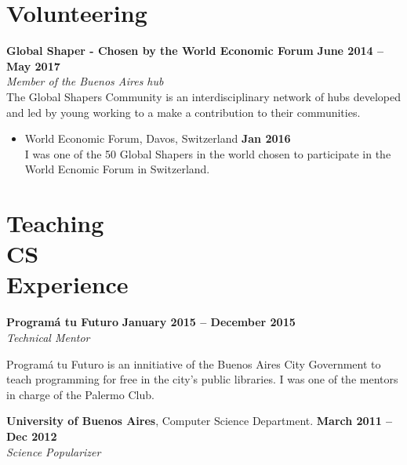 \documentclass[margin,line]{resume}
\begin{document}
\begin{resume}
\section{\mysidestyle Volunteering}



\textbf{Global Shaper - Chosen by the World Economic Forum} \hfill \textbf{June 2014 -- May 2017} \vspace{2mm}\\\vspace{1mm}
\textsl{Member of the Buenos Aires hub} \\
The Global Shapers Community is an interdisciplinary network of hubs developed and led by young working to a make a contribution to their communities.

\begin{itemize}
\item  World Economic Forum, Davos, Switzerland \hfill \textbf{Jan 2016} \vspace{2mm} \\
I was one of the 50 Global Shapers in the world chosen to participate in the World Ecnomic Forum in Switzerland.

\end{itemize}



\section{\mysidestyle Teaching\\CS\\Experience}

\textbf{Program\'a tu Futuro} \hfill \textbf{January 2015 --  December 2015}
\\
\textsl{Technical Mentor} \hfill 
\begin{list2}
	\item Program\'a tu Futuro is an innitiative of the Buenos Aires City Government to teach programming for free in the city's public libraries. I was one of the mentors in charge of the Palermo Club.
\end{list2}\vspace{-1.5mm}

\textbf{University of Buenos Aires}, Computer Science Department. \hfill \textbf{March 2011 --  Dec 2012}
\\
\textsl{Science Popularizer} \hfill 


\end{resume}
\end{document}
